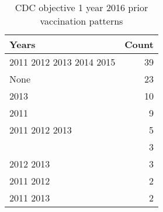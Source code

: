 \begin{table}

\caption{\label{tab:cdc-obj1-prior-vax-patterns}CDC objective 1 year 2016 prior vaccination patterns}
\centering
\begin{tabular}[t]{lr}
\toprule
Years & Count\\
\midrule
2011 2012 2013 2014 2015 & 39\\
None & 23\\
2013 & 10\\
2011 & 9\\
2011 2012 2013 & 5\\
\addlinespace
2012 & 3\\
2012 2013 & 3\\
2011 2012 & 2\\
2011 2013 & 2\\
\bottomrule
\end{tabular}
\end{table}
